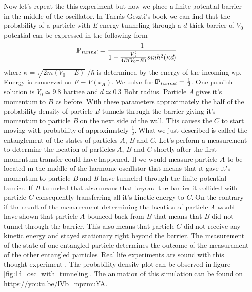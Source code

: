 Now let's repeat the this experiment but now we place a finite potential barrier in the middle of the oscillator.
In Tamás Geszti's book \cite{geszti2007} we can find that the probability of a particle with $E$ energy tunneling through a $d$ thick barrier of $V_0$ potential can be expressed in the following form
\begin{equation}
	\label{eq:tunelling probability}
	\text{I\kern-0.15em P}_{tunnel} = \frac{1}{1 + \frac{V_0^2}{4E(V_0 - E)}sinh^2(\kappa d)}
\end{equation}
where $\kappa = \sqrt{2m(V_0 - E)}\;/\hbar$ is determined by the energy of the incoming \acrshort{wp}.
Energy is conserved so $E = V(x_A)$.
We solve for $\text{I\kern-0.15em P}_{tunnel} = \frac{1}{2}$.
One possible solution is $V_0 \simeq 9.8$ hartree and $d \simeq 0.3$ Bohr radius.
Particle $A$ gives it's momentum to $B$ as before.
With these parameters approximately the half of the probability density of particle $B$ tunnels through the barrier giving it's momentum to particle $B$ on the next side of the wall.
This causes the $C$ to start moving with probability of approximately $\frac{1}{2}$.
What we just described is called the entanglement of the states of particles $A$, $B$ and $C$.
Let's perform a measurement to determine the location of particles $A$, $B$ and $C$ shortly after the first momentum transfer could have happened.
If we would measure particle $A$ to be located in the middle of the harmonic oscillator that means that it gave it's momentum to particle $B$ and $B$ have tunneled through the finite potential barrier.
If $B$ tunneled that also means that beyond the barrier it collided with particle $C$ consequently transferring all it's kinetic energy to $C$.
On the contrary if the result of the measurement determining the location of particle $A$ would have shown that particle $A$ bounced back from $B$ that means that $B$ did not tunnel through the barrier.
This also means that particle $C$ did not receive any kinetic energy and stayed stationary right beyond the barrier.
The measurement of the state of one entangled particle determines the outcome of the measurement of the other entangled particles.
Real life experiments are sound with this thought experiment \cite{Vasilyev2017}.
The probability density plot can be observed in figure \ref{fig:1d_osc_with_tunneling}.
The animation of this simulation can be found on \url{https://youtu.be/IVb_mpzmuYA}.
